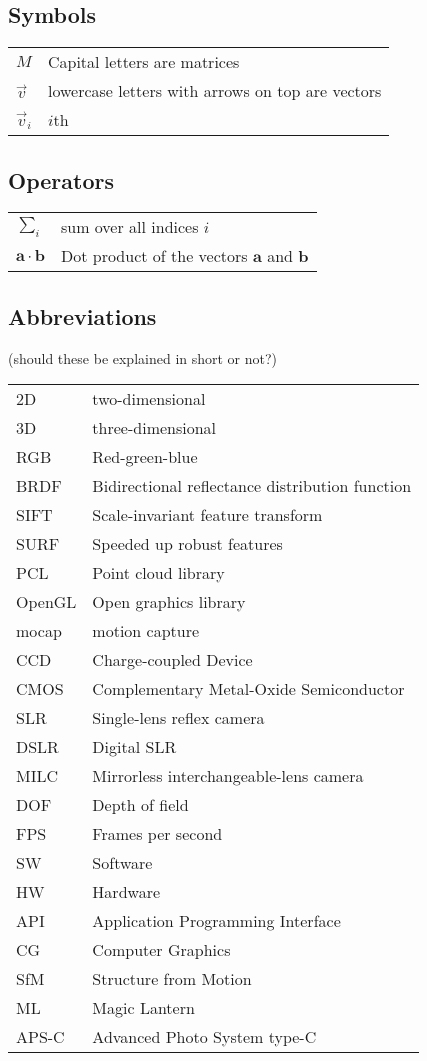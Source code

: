 
\subsection*{Symbols}

\begin{tabular}{ll}
$M$	& Capital letters are matrices\\
$\vec v$	& lowercase letters with arrows on top are vectors\\
$\vec v_i$	& $i$th 
\end{tabular}


\subsection*{Operators}

\begin{tabular}{ll}
$\sum_i $                        & sum over all indices $i$\\
$\mathbf{a} \cdot \mathbf{b}$    & Dot product of the vectors $\mathbf{a}$ and $\mathbf{b}$
\end{tabular}

\subsection*{Abbreviations}

(should these be explained in short or not?)

\begin{tabular}{ll}
	2D & two-dimensional\\
	3D & three-dimensional\\
	RGB & Red-green-blue\\
	BRDF & Bidirectional reflectance distribution function\\
	SIFT & Scale-invariant feature transform\\
	SURF & Speeded up robust features \\
	PCL & Point cloud library\\
	OpenGL & Open graphics library\\
	mocap & motion capture\\
	CCD & Charge-coupled Device\\
	CMOS & Complementary Metal-Oxide Semiconductor\\
	SLR & Single-lens reflex camera\\
	DSLR & Digital SLR\\
	MILC & Mirrorless interchangeable-lens camera\\
	DOF & Depth of field\\
	FPS & Frames per second\\
	SW & Software\\
	HW & Hardware\\
	API & Application Programming Interface\\
	CG & Computer Graphics\\
	SfM & Structure from Motion\\
	ML & Magic Lantern\\
	APS-C & Advanced Photo System type-C\\
\end{tabular}

